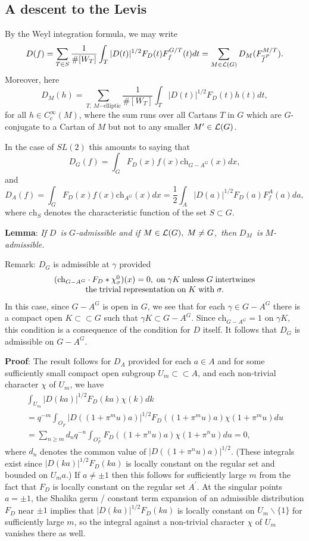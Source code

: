 \documentclass[11pt, a4paper]{article}
\begin{document}
\subsection{A descent to the Levis}

By the Weyl integration formula, we may write
\[
D(f)=\sum_{T\in S}{\frac 1{\#[W_T]}}\int_T|D(t)|^{1/2}F_D(t)F_f^{G/T}(t)dt=%
\sum_{M\in {\cal L}(G)}D_M(F_{\overline{f}^P}^{M/T}).
\]
Moreover, here
\[
D_M(h)=\sum_{T,\ M\mathrm{-elliptic}} {\frac 1{\#[W_T]}}%
\int_T|D(t)|^{1/2}F_D(t)h(t)dt,
\]
for all $h\in C_c^\infty (M)$, where the sum runs over all Cartans $T$ in $G$
which are $G$-conjugate to a Cartan of $M$ but not to any smaller $M^{\prime
}\in {\cal L}(G)$.

In the case of $SL(2)$ this amounts to saying that
\[
D_G(f)=\int_GF_D(x)f(x)\mathrm{ch}_{G-A^G}(x)dx,
\]
and
\[
D_A(f)=\int_GF_D(x)f(x)\mathrm{ch}_{A^G}(x)dx=\frac
12\int_A|D(a)|^{1/2}F_D(a)F_f^A(a)da,
\]
where $\mathrm{ch}_S$ denotes the characteristic function of the set $S\subset G$.

{\bf Lemma}: {\em If }$D${\em \ is }$G${\em -admissible and if }$M\in 
{\cal L}(G),\;M\neq G$,{\em \ then }$D_M${\em \ is }$M${\em -admissible.}

{\sc Remark}: $D_G$ is admissible at $\gamma $ provided
\[
\begin{array}{c}
(\mathrm{ch}_{G-A^G}\cdot F_D*\chi _\sigma ^0)(x)=0,\; {\rm on\;}\gamma K\;{\rm %
unless\;}G\;{\rm intertwines} \\ 
{\rm the\;trivial\;representation\;on\;}K\;{\rm with}\;\sigma .
\end{array}
\]
In this case, since $G-A^G$ is open in $G$, we see that for each $\gamma \in
G-A^G$ there is a compact open $K\subset \subset G$ such that $\gamma
K\subset G-A^G$. Since $\mathrm{ch}_{G-A^G}=1$ on $\gamma K$, this condition is a
consequence of the condition for $D$ itself. It follows that $D_G$ is
admissible on $G-A^G$.

{\bf Proof}: The result follows for $D_A$ provided for each $a\in A$ and for
some sufficiently small compact open subgroup $U_m\subset \subset A$, and
each non-trivial character $\chi $ of $U_m$, we have
\[
\begin{array}{c}
\int_{U_m}|D(ka)|^{1/2}F_D(ka)\chi (k)dk \\ 
=q^{-m}\int_{O_F}|D((1+\pi ^mu)a)|^{1/2}F_D((1+\pi ^mu)a)\chi (1+\pi ^mu)du
\\ 
=\sum_{n\geq m}d_nq^{-n}\int_{O_F^{\times }}F_D((1+\pi ^nu)a)\chi (1+\pi
^nu)du=0,
\end{array}
\]
where $d_n$ denotes the common value of $|D((1+\pi ^nu)a)|^{1/2}$. (These
integrals exist since $|D(ka)|^{1/2}F_D(ka)$ is locally constant on the
regular set and bounded on $U_m a$.) If $a\neq \pm 1$ then this follows for sufficiently large $m$ from
the fact that $F_D$ is locally constant on the regular set $A^{\prime }$. At the singular points $a=\pm 1$, the Shalika germ / constant term expansion of an admissible distribution $F_D$ near $\pm 1$ implies that $|D(ka)|^{1/2}F_D(ka)$ is locally constant on $U_m\backslash \{1\}$ for sufficiently large $m$, so the integral against a non-trivial character $\chi $ of $U_m$ vanishes there as well.
\end{document}
